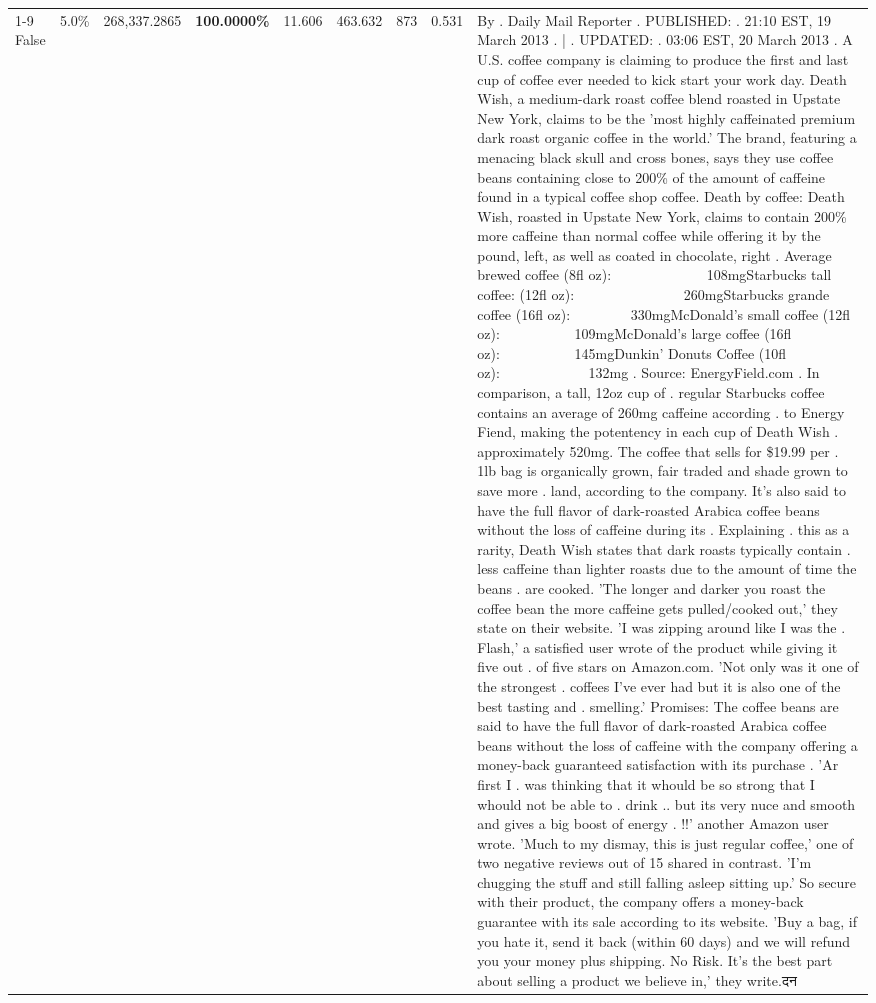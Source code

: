 \begin{table}[H]
{\begin{tabular}{lllrlllll}
\cline{1-9}
False & 5.0\% & \color{red} 268,337.2865 & \bfseries \color{red} 100.0000\% & 11.606 & 463.632 & 873 & 0.531 & By . Daily Mail Reporter . PUBLISHED: . 21:10 EST, 19 March 2013 . | . UPDATED: . 03:06 EST, 20 March 2013 . A U.S. coffee company is claiming to produce the first and last cup of coffee ever needed to kick start your work day. Death Wish, a medium-dark roast coffee blend roasted in Upstate New York, claims to be the 'most highly caffeinated premium dark roast organic coffee in the world.' The brand, featuring a menacing black skull and cross bones, says they use coffee beans containing close to 200\% of the amount of caffeine found in a typical coffee shop coffee. Death by coffee: Death Wish, roasted in Upstate New York, claims to contain 200\% more caffeine than normal coffee while offering it by the pound, left, as well as coated in chocolate, right . Average brewed coffee (8fl oz):              108mgStarbucks tall coffee: (12fl oz):                260mgStarbucks grande coffee (16fl oz):         330mgMcDonald's small coffee (12fl oz):           109mgMcDonald's large coffee (16fl oz):           145mgDunkin' Donuts Coffee (10fl oz):             132mg . Source: EnergyField.com . In comparison, a tall, 12oz cup of . regular Starbucks coffee contains an average of 260mg caffeine according . to Energy Fiend, making the potentency in each cup of Death Wish . approximately 520mg. The coffee that sells for \$19.99 per . 1lb bag is organically grown, fair traded and shade grown to save more . land, according to the company. It's also said to have the full flavor of dark-roasted Arabica coffee beans without the loss of caffeine during its . Explaining . this as a rarity, Death Wish states that dark roasts typically contain . less caffeine than lighter roasts due to the amount of time the beans . are cooked. 'The longer and darker you roast the coffee bean the more caffeine gets pulled/cooked out,' they state on their website. 'I was zipping around like I was the . Flash,' a satisfied user wrote of the product while giving it five out . of five stars on Amazon.com. 'Not only was it one of the strongest . coffees I've ever had but it is also one of the best tasting and . smelling.’ Promises: The coffee beans are said to have the full flavor of dark-roasted Arabica coffee beans without the loss of caffeine with the company offering a money-back guaranteed satisfaction with its purchase . 'Ar first I . was thinking that it whould be so strong that I whould not be able to . drink .. but its very nuce and smooth and gives a big boost of energy . !!' another Amazon user wrote. 'Much to my dismay, this is just regular coffee,' one of two negative reviews out of 15 shared in contrast. 'I'm chugging the stuff and still falling asleep sitting up.' So secure with their product, the company offers a money-back guarantee with its sale according to its website. 'Buy a bag, if you hate it, send it back (within 60 days) and we will refund you your money plus shipping. No Risk. It’s the best part about selling a product we believe in,' they write.दन \\

\end{tabular}}
\end{table}
